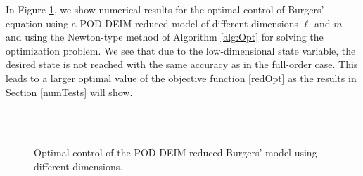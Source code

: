 In Figure \ref{optred}, we show numerical results for the optimal control of Burgers' equation using a POD-DEIM reduced model of different dimensions $\ell$ and $m$ and using the Newton-type method of Algorithm \ref{alg:Opt} for solving the optimization problem. We see that due to the low-dimensional state variable, the desired state is not reached with the same accuracy as in the full-order case. This leads to a larger optimal value of the objective function \eqref{redOpt} as the results in Section \ref{numTests} will show.
\begin{figure}[H]
\centering
{}\hfill
{}\\
\hfill
{}\\
\caption{Optimal control of the POD-DEIM reduced Burgers' model using different dimensions.}\label{optred}
\end{figure}
